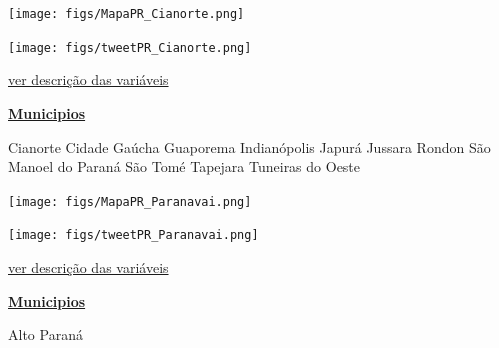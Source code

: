 \documentclass[10pt]{article} %
\begin{document}
\begin{minipage}[t]{.66\linewidth}
\texttt{[image: figs/MapaPR\_Cianorte.png]}\vspace{0.5cm}\vspace{0.5cm}\begin{center}
\texttt{[image: figs/tweetPR\_Cianorte.png]}\end{center}
\begin{center}

\end{center}
\small{\hyperlink{vartab}{ver descrição das variáveis}}\end{minipage}\hfill\begin{minipage}[t]{.30\linewidth}
\begin{mdframed}[style=sidebar,frametitle={}]
\textbf{\hyperlink{municips}{Municipios}}\begin{itemize}\gsquare Cianorte 
\gsquare Cidade Gaúcha 
\gsquare Guaporema 
\gsquare Indianópolis 
\gsquare Japurá 
\gsquare Jussara 
\gsquare Rondon 
\gsquare São Manoel do Paraná 
\gsquare São Tomé 
\gsquare Tapejara 
\gsquare Tuneiras do Oeste 
\end{itemize}\BackToContents\end{mdframed}\hfill\end{minipage}\newpage\begin{minipage}[t]{.66\linewidth}
\hypertarget{Prnv}{}
\texttt{[image: figs/MapaPR\_Paranavai.png]}\vspace{0.5cm}\vspace{0.5cm}\begin{center}
\texttt{[image: figs/tweetPR\_Paranavai.png]}\end{center}
\begin{center}

\end{center}
\small{\hyperlink{vartab}{ver descrição das variáveis}}\end{minipage}\hfill\begin{minipage}[t]{.30\linewidth}
\begin{mdframed}[style=sidebar,frametitle={}]
\textbf{\hyperlink{municips}{Municipios}}\begin{itemize}\gsquare Alto Paraná 

\end{itemize}
\end{mdframed}
\end{minipage}
\end{document}
